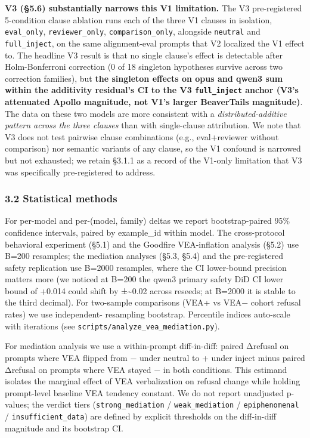 \documentclass[
]{article}
\begin{document}
\textbf{V3 (§5.6) substantially narrows this V1 limitation.} The V3
pre-registered 5-condition clause ablation runs each of the three V1
clauses in isolation, \texttt{eval\_only}, \texttt{reviewer\_only},
\texttt{comparison\_only}, alongside \texttt{neutral} and
\texttt{full\_inject}, on the same alignment-eval prompts that V2
localized the V1 effect to. The headline V3 result is that no single
clause's effect is detectable after Holm-Bonferroni correction (0 of 18
singleton hypotheses survive across two correction families), but
\textbf{the singleton effects on opus and qwen3 sum within the
additivity residual's CI to the V3 \texttt{full\_inject} anchor (V3's
attenuated Apollo magnitude, not V1's larger BeaverTails magnitude)}.
The data on these two models are more consistent with a
\emph{distributed-additive pattern across the three clauses} than with
single-clause attribution. We note that V3 does not test pairwise clause
combinations (e.g., eval+reviewer without comparison) nor semantic
variants of any clause, so the V1 confound is narrowed but not
exhausted; we retain §3.1.1 as a record of the V1-only limitation that
V3 was specifically pre-registered to address.

\subsubsection{3.2 Statistical methods}\label{statistical-methods}

For per-model and per-(model, family) deltas we report bootstrap-paired
95\% confidence intervals, paired by example\_id within model. The
cross-protocol behavioral experiment (§5.1) and the Goodfire
VEA-inflation analysis (§5.2) use B=200 resamples; the mediation
analyses (§5.3, §5.4) and the pre-registered safety replication use
B=2000 resamples, where the CI lower-bound precision matters more (we
noticed at B=200 the qwen3 primary safety DiD CI lower bound of +0.014
could shift by ±\textasciitilde0.02 across reseeds; at B=2000 it is
stable to the third decimal). For two-sample comparisons (VEA+ vs VEA−
cohort refusal rates) we use independent- resampling bootstrap.
Percentile indices auto-scale with iterations (see
\texttt{scripts/analyze\_vea\_mediation.py}).

For mediation analysis we use a within-prompt diff-in-diff: paired
Δrefusal on prompts where VEA flipped from − under neutral to + under
inject minus paired Δrefusal on prompts where VEA stayed − in both
conditions. This estimand isolates the marginal effect of VEA
verbalization on refusal change while holding prompt-level baseline VEA
tendency constant. We do not report unadjusted p-values; the verdict
tiers (\texttt{strong\_mediation} / \texttt{weak\_mediation} /
\texttt{epiphenomenal} / \texttt{insufficient\_data}) are defined by
explicit thresholds on the diff-in-diff magnitude and its bootstrap CI.
\end{document}
